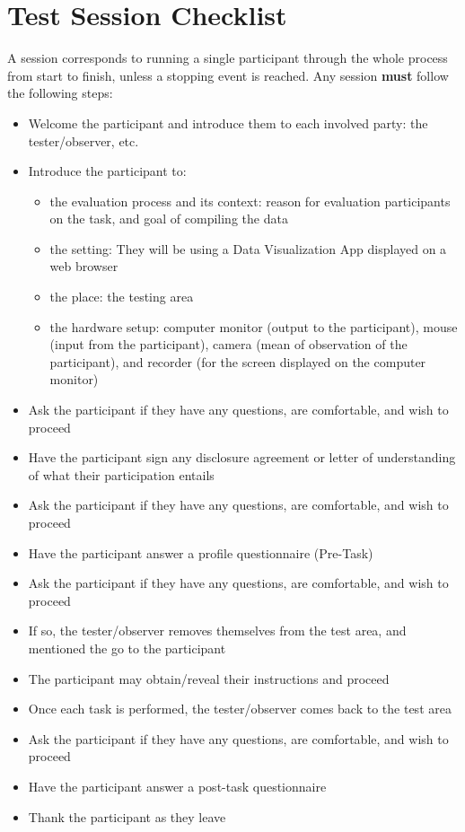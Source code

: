 \documentclass[twocolumn, letterpaper,13pt]{scrartcl}
\begin{document}
    \section*{Test Session Checklist}
    A session corresponds to running a single participant through the whole process from start to finish, unless a stopping event is reached. Any session \textbf{must} follow the following steps:
    \begin{itemize}
        \item Welcome the participant and introduce them to each involved party: the tester/observer, etc.
        \item Introduce the participant to:
        \begin{itemize}
            \item the evaluation process and its context: reason for evaluation participants on the task, and goal of compiling the data
            \item the setting: They will be using a Data Visualization App displayed on a web browser
            \item the place: the testing area
            \item the hardware setup: computer monitor (output to the participant), mouse (input from the participant), camera (mean of observation of the participant), and recorder (for the screen displayed on the computer monitor)
        \end{itemize}
        \item Ask the participant if they have any questions, are comfortable, and wish to proceed
        \item Have the participant sign any disclosure agreement or letter of understanding of what their participation entails
        \item Ask the participant if they have any questions, are comfortable, and wish to proceed
        \item Have the participant answer a profile questionnaire (Pre-Task)
        \item Ask the participant if they have any questions, are comfortable, and wish to proceed
        \item If so, the tester/observer removes themselves from the test area, and mentioned the go to the participant
        \item The participant may obtain/reveal their instructions and proceed
        \item Once each task is performed, the tester/observer comes back to the test area
        \item Ask the participant if they have any questions, are comfortable, and wish to proceed
        \item Have the participant answer a post-task questionnaire
        \item Thank the participant as they leave
    \end{itemize}
    
\end{document}
